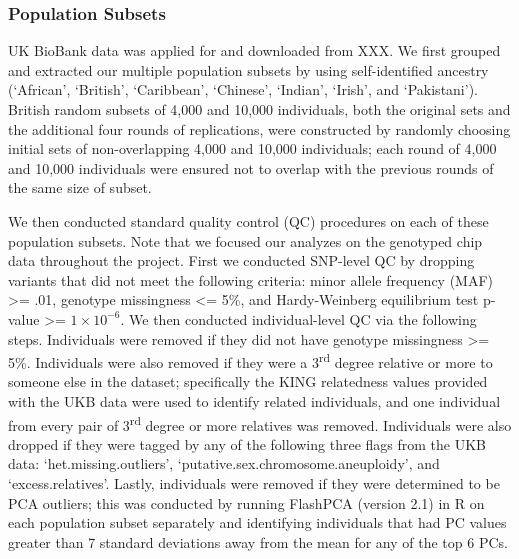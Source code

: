 \documentclass[12pt, a4paper]{article}
\begin{document}
\subsubsection{Population Subsets}
UK BioBank data was applied for and downloaded from XXX. We first grouped and extracted our multiple population subsets by using self-identified ancestry (`African', `British', `Caribbean', `Chinese', `Indian', `Irish', and `Pakistani'). British random subsets of 4,000 and 10,000 individuals, both the original sets and the additional four rounds of replications, were constructed by randomly choosing initial sets of non-overlapping 4,000 and 10,000 individuals; each round of 4,000 and 10,000 individuals were ensured not to overlap with the previous rounds of the same size of subset. 

We then conducted standard quality control (QC) procedures on each of these population subsets. Note that we focused our analyzes on the genotyped chip data throughout the project. First we conducted SNP-level QC by dropping variants that did not meet the following criteria:  minor allele frequency (MAF) >= .01, genotype missingness <= 5\%, and Hardy-Weinberg equilibrium test p-value >= $1\times10^{-6}$. We then conducted individual-level QC via the following steps. Individuals were removed if they did not have genotype missingness >= 5\%. Individuals were also removed if they were a 3\textsuperscript{rd} degree relative or more to someone else in the dataset; specifically the KING relatedness values provided with the UKB data were used to identify related individuals, and one individual from every pair of 3\textsuperscript{rd} degree or more relatives was removed. Individuals were also dropped if they were tagged by any of the following three flags from the UKB data: `het.missing.outliers', `putative.sex.chromosome.aneuploidy', and `excess.relatives'. Lastly, individuals were removed if they were determined to be PCA outliers; this was conducted by running FlashPCA (version 2.1) \citep{Abraham2017} in R on each population subset separately and identifying individuals that had PC values greater than 7 standard deviations away from the mean for any of the top 6 PCs. 
\end{document}
